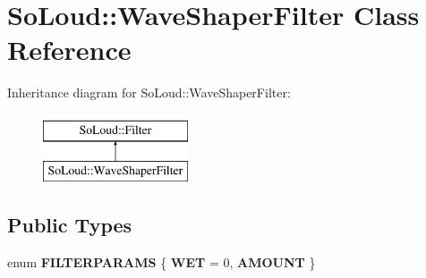 \hypertarget{class_so_loud_1_1_wave_shaper_filter}{}\section{So\+Loud\+::Wave\+Shaper\+Filter Class Reference}
\label{class_so_loud_1_1_wave_shaper_filter}
Inheritance diagram for So\+Loud\+::Wave\+Shaper\+Filter\+:\begin{figure}[H]
\begin{center}
\leavevmode
\includegraphics[height=2.000000cm]{class_so_loud_1_1_wave_shaper_filter}
\end{center}
\end{figure}
\subsection*{Public Types}
\begin{DoxyCompactItemize}
\item 
\mbox{\label{class_so_loud_1_1_wave_shaper_filter_a2f2715016266e9b55c16a20ce3a02238}} 
enum {\bfseries F\+I\+L\+T\+E\+R\+P\+A\+R\+A\+MS} \{ {\bfseries W\+ET} = 0, 
{\bfseries A\+M\+O\+U\+NT}
 \}
\end{DoxyCompactItemize}
